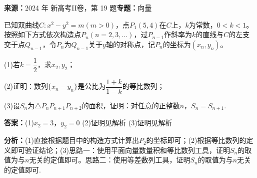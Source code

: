 \begin{question}[points=17]
\textbf{来源：}2024 年 新高考II卷，第 19 题\quad \textbf{专题：}向量\par
已知双曲线$C:x^2-y^2=m(m>0)$，点$P_1(5,4)$在$C$上，$k$为常数，$0<k<1$。按照如下方式依次构造点$P_n(n=2,3,\ldots)$，过$P_{n-1}$作斜率为$k$的直线与$C$的左支交于点$Q_{n-1}$，令$P_n$为$Q_{n-1}$关于$y$轴的对称点，记$P_n$的坐标为$(x_n,y_n)$。

(1)若$k=\dfrac{1}{2}$，求$x_2,y_2$；

(2)证明：数列$\{x_n-y_n\}$是公比为$\dfrac{1+k}{1-k}$的等比数列；

(3)设$S_n$为$\triangle P_nP_{n+1}P_{n+2}$的面积，证明：对任意的正整数$n$，$S_n=S_{n+1}$.
\begin{solution}
\textbf{答案：}(1)$x_2=3$，$y_2=0$
(2)证明见解析
(3)证明见解析

\textbf{分析：}(1)直接根据题目中的构造方式计算出$P_2$的坐标即可；(2)根据等比数列的定义即可验证结论；(3)思路一：使用平面向量数量积和等比数列工具，证明$S_n$的取值为与$n$无关的定值即可。思路二：使用等差数列工具，证明$S_n$的取值为与$n$无关的定值即可.


\end{solution}
\end{question}
